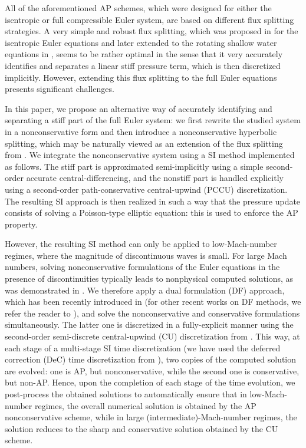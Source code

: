 \documentclass[A4paper,12pt,twoside]{article}
\numberwithin{equation}{section}
\numberwithin{figure}{section}
\numberwithin{table}{section}
\begin{document}
All of the aforementioned AP schemes, which were designed for either the isentropic or full compressible Euler system, are based on 
different flux splitting strategies.  A very simple and robust flux splitting, which was proposed in \cite{haack2012all} for the isentropic 
Euler equations and later extended to the rotating shallow water equations in \cite{LCK}, seems to be rather optimal in the sense that
it very accurately identifies and separates a linear stiff pressure term, which is then discretized implicitly. However, extending this flux
splitting to the full Euler equations presents significant challenges. 

In this paper, we propose an alternative way of accurately identifying and separating a stiff part of the full Euler system: we first
rewrite the studied system in a nonconservative form and then introduce a nonconservative hyperbolic splitting, which may be naturally
viewed as an extension of the flux splitting from \cite{haack2012all}. We integrate the nonconservative system using a SI method 
implemented as follows. The stiff part is approximated semi-implicitly using a simple second-order accurate central-differencing, and the 
nonstiff part is handled explicitly using a second-order {\color{black}path-conservative central-upwind (PCCU)} discretization. The resulting
SI approach is then realized in such a way that the pressure update consists of solving a Poisson-type elliptic equation: this is used to 
enforce the AP property.

However, the resulting SI method can only be applied to low-Mach-number regimes, where the magnitude of discontinuous waves is small.
For large Mach numbers, solving nonconservative formulations of the Euler equations in the presence of discontinuities typically leads to
nonphysical computed solutions, as was demonstrated in \cite{abgrall2010comment,HouLeF}. We therefore apply a dual formulation (DF)
approach, which has been recently introduced in \cite{CFKM} (for other recent works on DF methods, we refer the reader to
\cite{Abg2023,ACKM,AbgLiu,pidatella2019semi}), and solve the nonconservative and conservative formulations simultaneously. The latter one is
discretized in a fully-explicit manner using the second-order semi-discrete central-upwind (CU) discretization from \cite{KLin}. This way,
at each stage of a multi-stage SI time discretization (we have used the deferred correction (DeC) time discretization from
\cite{offner2025analysis}), two copies of the computed solution are evolved: one is AP, but nonconservative, while the second one is
conservative, but non-AP. Hence, upon the completion of each stage of the time evolution, we post-process the obtained solutions to
automatically ensure that in low-Mach-number regimes, the overall numerical solution is obtained by the AP nonconservative scheme, while in
large (intermediate)-Mach-number regimes, the solution reduces to the sharp and conservative solution obtained by the CU scheme.
\end{document}
